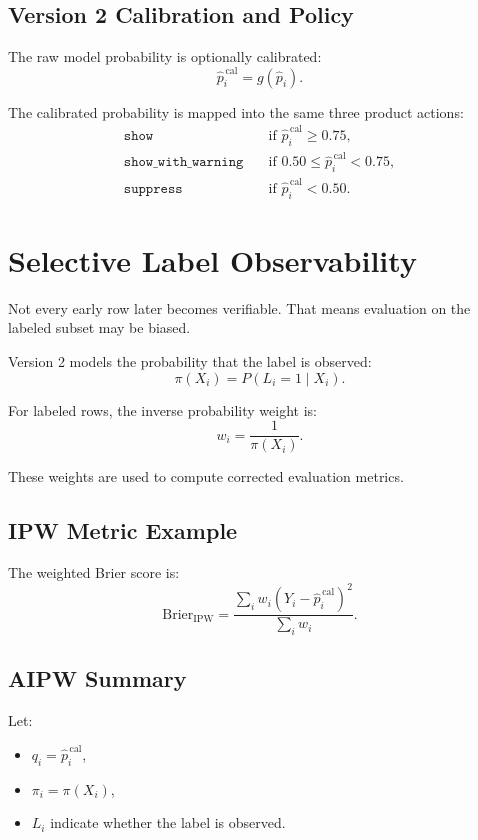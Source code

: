 \documentclass[11pt]{article}
\begin{document}
\subsection{Version 2 Calibration and Policy}

The raw model probability is optionally calibrated:
\[
\hat{p}_i^{\,\text{cal}} = g(\hat{p}_i).
\]

The calibrated probability is mapped into the same three product actions:
\begin{align*}
\texttt{show} &\quad \text{if } \hat{p}_i^{\,\text{cal}} \ge 0.75, \\
\texttt{show\_with\_warning} &\quad \text{if } 0.50 \le \hat{p}_i^{\,\text{cal}} < 0.75, \\
\texttt{suppress} &\quad \text{if } \hat{p}_i^{\,\text{cal}} < 0.50.
\end{align*}

\section{Selective Label Observability}

Not every early row later becomes verifiable. That means evaluation on the labeled subset may be biased.

Version 2 models the probability that the label is observed:
\[
\pi(X_i) = P(L_i = 1 \mid X_i).
\]

For labeled rows, the inverse probability weight is:
\[
w_i = \frac{1}{\pi(X_i)}.
\]

These weights are used to compute corrected evaluation metrics.

\subsection{IPW Metric Example}

The weighted Brier score is:
\[
\text{Brier}_{\text{IPW}}
=
\frac{\sum_i w_i \left(Y_i - \hat{p}_i^{\,\text{cal}}\right)^2}{\sum_i w_i}.
\]

\subsection{AIPW Summary}

Let:
\begin{itemize}[leftmargin=1.5em]
    \item $q_i = \hat{p}_i^{\,\text{cal}}$,
    \item $\pi_i = \pi(X_i)$,
    \item $L_i$ indicate whether the label is observed.
\end{itemize}
\end{document}
